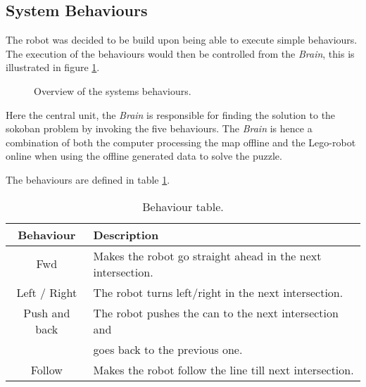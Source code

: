 \subsection{System Behaviours}
The robot was decided to be build upon being able to execute simple behaviours.
The execution of the behaviours would then be controlled from the \textit{Brain},
this is illustrated in figure \ref{fig:behaviourSystem}.

\begin{figure}[H]
\center
{}
\caption{Overview of the systems behaviours.}
\label{fig:behaviourSystem}
\end{figure}

Here the central unit, the \textit{Brain} is responsible for finding the solution to the sokoban problem by invoking the five behaviours.
The \textit{Brain} is hence a combination of both the computer processing the map offline and the Lego-robot online when using the offline generated data to solve the puzzle.

The behaviours are defined in table \ref{tab:behaviourExplained}.
\begin{table}[H]
\center
\begin{tabular}{c|l}
Behaviour & Description \\ \hline
Fwd & Makes the robot go straight ahead in the next intersection. \\
Left / Right & The robot turns left/right in the next intersection. \\
Push and back & The robot pushes the can to the next intersection and \\ & goes back to the previous one. \\
Follow & Makes the robot follow the line till next intersection.
\end{tabular}
\caption{Behaviour table.}
\label{tab:behaviourExplained}
\end{table}

